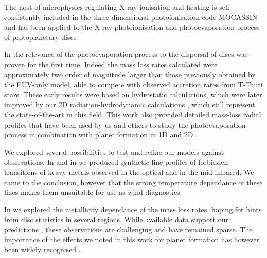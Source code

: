 \documentclass[10pt,fleqn,twoside]{article}
\begin{document}
 The host of microphysics regulating
X-ray ionisation and heating is self-consistently included in the
three-dimensional photoionisation code MOCASSIN 
\citep{2003MNRAS.340.1136E, 2005MNRAS.362.1038E, 2008ApJS..175..534E}
and has been applied to the X-ray photoionisation and
photoevaporation process of protoplanetary discs 
\citep{2008ApJ...688..398E, 2009ApJ...699.1639E, 
2010MNRAS.406.1553E, 2016MNRAS.460.3472E, 
2010MNRAS.401.1415O, 2011MNRAS.412...13O, 2012MNRAS.422.1880O}


In 
\citet{2008ApJ...688..398E, 2009ApJ...699.1639E}
the relevance of the photoevaporation process
to the dispersal of discs was proven for the first time. Indeed the mass
loss rates calculated were approximately two order of magnitude larger
than those previously obtained by the EUV-only model, able to compete
with observed accretion rates from T-Tauri stars. These early results
were based on hydrostatic calculations, which were later improved by
our 2D radiation-hydrodynamic calculations 
\citep{2010MNRAS.401.1415O, 2011MNRAS.412...13O, 2012MNRAS.422.1880O},
which still represent the state-of-the-art in
this field. This work also provided detailed mass-loss radial profiles
that have been used by us and others to study the photoevaporation
process in combination with planet formation in 1D and 2D
\citep[e.g.,][]{2013MNRAS.430.1392R, 2015MNRAS.454.2173R}.

We explored several possibilities to test and refine our
models against observations. In 
\citet{2010MNRAS.406.1553E, 2016MNRAS.460.3472E}
and in
\citet{2010MNRAS.401.1636S}
we
produced synthetic line profiles of forbidden transitions of heavy
metals observed in the optical and in the mid-infrared. We came to the
conclusion, however that the strong temperature dependance of these
lines makes them unsuitable for use as wind diagnostics. 

In 
\citet{2010MNRAS.402.2735E}
we explored the metallicity dependance of the mass
loss rates, hoping for hints from disc statistics in several
regions. While available data support our predictions 
\citep{2009AIPC.1158..171Y, 2010ApJ...723L.113Y},
these observations are challenging and have
remained sparse. The importance of the effects we noted in this
work for planet formation has however been widely recognised
\citep[e.g.,][]{2016arXiv161001170L}.
\end{document}
